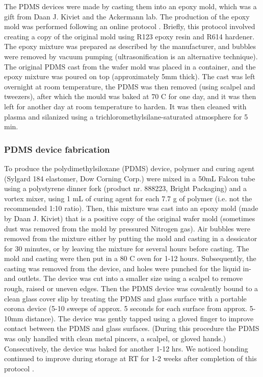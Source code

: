 The PDMS devices were made by casting them into an epoxy mold, which was a gift from Daan J. Kiviet and the Ackermann lab. 
The production of the epoxy mold was performed following an online protocol \cite{EstevezTorres2009}. 
Briefly, this protocol involved creating a copy of the original mold using R123 epoxy resin and R614 hardener. 
The epoxy mixture was prepared as described by the manufacturer, and bubbles were removed by vacuum pumping (ultrasonification is an alternative technique).
The original PDMS cast from the wafer mold was placed in a container, and the epoxy mixture was poured on top (approximately 5mm thick).
The cast was left overnight at room temperature, the PDMS was then removed (using scalpel and tweezers), after which the mould was baked at 70 C for one day, and it was then left for another day at room temperature to harden.
It was then cleaned with plasma and silanized using a trichloromethylsilane-saturated atmosphere for 5 min.

\subsubsection{PDMS device fabrication}

To produce the polydimethylsiloxane (PDMS) device, polymer and curing agent (Sylgard 184 elastomer, Dow Corning Corp.) were mixed in a 50mL Falcon tube using a polystyrene dinner fork (product nr. 888223, Bright Packaging) and a vortex mixer, using 1 mL of curing agent for each 7.7 g of polymer (i.e. not the recommended 1:10 ratio).
Then, this mixture was cast into an epoxy mold (made by Daan J. Kiviet) that is a positive copy of the original wafer mold (sometimes dust was removed from the mold by pressured Nitrogen gas).
Air bubbles were removed from the mixture either by putting the mold and casting in a dessicator for 30 minutes, or by leaving the mixture for several hours before casting.
The mold and casting were then put in a 80 C oven for 1-12 hours. 
Subsequently, the casting was removed from the device, and holes were punched for the liquid in- and outlets.
The device was cut into a smaller size using a scalpel to remove rough, raised or uneven edges.
Then the PDMS device was covalently bound to a clean glass cover slip by treating the PDMS and glass surface with a portable corona device \cite{Haubert2006} (5-10 sweeps of approx. 5 seconds for each surface from approx. 5-10mm distance).
The device was gently tapped using a gloved finger to improve contact between the PDMS and glass surfaces.
(During this procedure the PDMS was only handled with clean metal pincers, a scalpel, or gloved hands.)
Consecutively, the device was baked for another 1-12 hrs. We noticed bonding continued to improve during storage at RT for 1-2 weeks after completion of this protocol .

